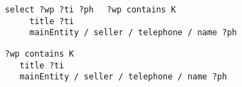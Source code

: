 \verb|select ?wp ?ti ?ph|
\verb|  ?wp contains K|\\
\verb|     title ?ti|\\
\verb|     mainEntity / seller / telephone / name ?ph|

\begin{lstlisting}
?wp contains K
   title ?ti
   mainEntity / seller / telephone / name ?ph
\end{lstlisting}